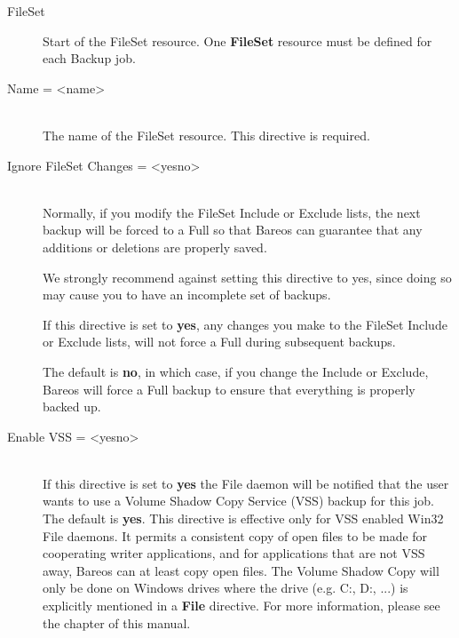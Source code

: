 \begin{description}

\item [FileSet]
Start of the FileSet resource. One {\bf FileSet}  resource must be
defined for each Backup job.

\item [Name = {\textless}name{\textgreater}] \hfill \\
   The name of the FileSet resource.  This directive is required.

\item [Ignore FileSet Changes = {\textless}yes{\textbar}no{\textgreater}] \hfill \\
   Normally, if you modify the FileSet Include or Exclude lists,
   the next backup will be forced to a Full so that Bareos can
   guarantee that any additions or deletions are properly saved.

   We strongly recommend against setting this directive to yes,
   since doing so may cause you to have an incomplete set of backups.

   If this directive is set to {\bf yes}, any changes you make to the
   FileSet Include or Exclude lists, will not force a Full during
   subsequent backups.

   The default is {\bf no}, in which case, if you change the Include or
   Exclude, Bareos will force a Full backup to ensure that everything is
   properly backed up.

\item [Enable VSS = {\textless}yes{\textbar}no{\textgreater}] \hfill \\
  If this directive is set to {\bf yes} the File daemon will be notified
  that the user wants to use a Volume Shadow Copy Service (VSS) backup
  for this job. The default is {\bf yes}. This directive is effective
  only for VSS enabled Win32 File daemons. It permits a consistent copy
  of open files to be made for cooperating writer applications, and for
  applications that are not VSS away, Bareos can at least copy open files.
  The Volume Shadow Copy will only be done on Windows drives where the
  drive (e.g. C:, D:, ...) is explicitly mentioned in a {\bf File}
  directive.
  For more information, please see the
   chapter of this manual.


\end{description}

